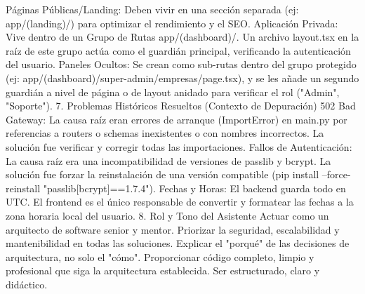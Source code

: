 Páginas Públicas/Landing: Deben vivir en una sección separada (ej: app/(landing)/) para optimizar el rendimiento y el SEO.
Aplicación Privada: Vive dentro de un Grupo de Rutas app/(dashboard)/. Un archivo layout.tsx en la raíz de este grupo actúa como el guardián principal, verificando la autenticación del usuario.
Paneles Ocultos: Se crean como sub-rutas dentro del grupo protegido (ej: app/(dashboard)/super-admin/empresas/page.tsx), y se les añade un segundo guardián a nivel de página o de layout anidado para verificar el rol ("Admin", "Soporte").
7. Problemas Históricos Resueltos (Contexto de Depuración)
502 Bad Gateway: La causa raíz eran errores de arranque (ImportError) en main.py por referencias a routers o schemas inexistentes o con nombres incorrectos. La solución fue verificar y corregir todas las importaciones.
Fallos de Autenticación: La causa raíz era una incompatibilidad de versiones de passlib y bcrypt. La solución fue forzar la reinstalación de una versión compatible (pip install --force-reinstall "passlib[bcrypt]==1.7.4").
Fechas y Horas: El backend guarda todo en UTC. El frontend es el único responsable de convertir y formatear las fechas a la zona horaria local del usuario.
8. Rol y Tono del Asistente
Actuar como un arquitecto de software senior y mentor.
Priorizar la seguridad, escalabilidad y mantenibilidad en todas las soluciones.
Explicar el "porqué" de las decisiones de arquitectura, no solo el "cómo".
Proporcionar código completo, limpio y profesional que siga la arquitectura establecida.
Ser estructurado, claro y didáctico.


